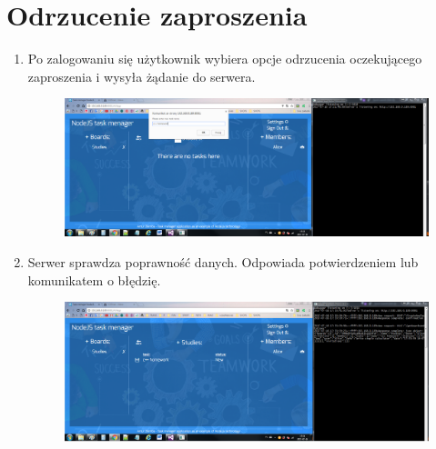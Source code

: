 \documentclass[12pt]{report}
\begin{document}
\section{Odrzucenie zaproszenia}
\begin{enumerate}
\item Po zalogowaniu się użytkownik wybiera opcje odrzucenia oczekującego zaproszenia i wysyła żądanie do serwera.
\begin{figure}[!hb]
\centering
\includegraphics[width=\textwidth,height=\textheight,keepaspectratio]{A1.png}
\end{figure}
\item Serwer sprawdza poprawność danych. Odpowiada potwierdzeniem lub komunikatem o błędzię.
\begin{figure}[!hb]
\centering
\includegraphics[width=\textwidth,height=\textheight,keepaspectratio]{A2.png}
\end{figure}
\end{enumerate}
\end{document}
